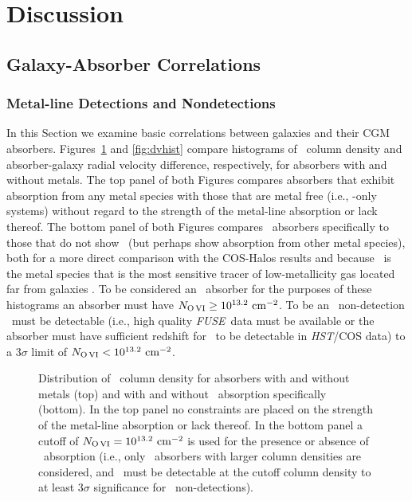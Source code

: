 \documentclass[twocolumn,twocolappendix,tighten,times]{aastex6}
\newcommand{\HI}{\ion{H}{1}}
\newcommand{\OVI}{\ion{O}{6}}
\newcommand{\fuse}{{\sl FUSE}}
\newcommand{\hst}{{\sl HST}}
\begin{document}
\section{Discussion}
\label{discussion}

\subsection{Galaxy-Absorber Correlations}
\label{discussion:correlations}

\subsubsection{Metal-line Detections and Nondetections}
\label{discussion:correlations:metals}

In this Section we examine basic correlations between galaxies and their CGM 
absorbers. Figures~\ref{fig:HIhist} and \ref{fig:dvhist} compare histograms of 
\HI\ column density and absorber-galaxy radial velocity difference, 
respectively, for absorbers with and without metals. The top panel of both 
Figures compares absorbers that exhibit absorption from any metal species with 
those that are metal free (i.e., \HI-only systems) without regard to the 
strength of the metal-line absorption or lack thereof. The bottom panel of 
both Figures compares \OVI\ absorbers specifically to those that do not show 
\OVI\ (but perhaps show absorption from other metal species), both for a more 
direct comparison with the COS-Halos results and because \OVI\ is the metal 
species that is the most sensitive tracer of low-metallicity gas located far
from galaxies \citep{stocke06,stocke07}. To be considered an \OVI\ absorber 
for the purposes of these histograms an absorber must have 
$N_{\rm O\,VI} \geq 10^{13.2}~{\rm cm}^{-2}$. To be an \OVI\ non-detection 
\OVI\ must be detectable (i.e., high quality \fuse\ data must be available or 
the absorber must have sufficient redshift for \OVI\ to be detectable in \hst/COS data) to a $3\sigma$ limit of $N_{\rm O\,VI} < 10^{13.2}~{\rm cm}^{-2}$.


\begin{figure}[!t]
\caption{Distribution of \HI\ column density for absorbers with and without metals (top) and with and without \OVI\ absorption specifically (bottom). In the top panel no constraints are placed on the strength of the metal-line absorption or lack thereof. In the bottom panel a cutoff of $N_{\rm O\,VI} = 10^{13.2}~{\rm cm}^{-2}$ is used for the presence or absence of \OVI\ absorption (i.e., only \OVI\ absorbers with larger column densities are considered, and \OVI\ must be detectable at the cutoff column density to at least $3\sigma$ significance for \OVI\ non-detections).
\label{fig:HIhist}}
\end{figure}
\end{document}
